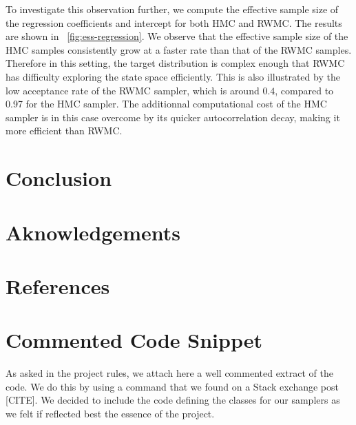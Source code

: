 \documentclass[a4paper, 12pt,oneside]{article}
\begin{document}
		To investigate this observation further, we compute the effective sample size of the regression coefficients and intercept for both HMC and RWMC. The results are shown in ~\ref{fig:ess-regression}. We observe that the effective sample size of the HMC samples consistently grow at a faster rate than that of the RWMC samples. Therefore in this setting, the target distribution is complex enough that RWMC has difficulty exploring the state space efficiently. This is also illustrated by the low acceptance rate of the RWMC sampler, which is around $0.4$, compared to 0.97 for the HMC sampler. The additionnal computational cost of the HMC sampler is in this case overcome by its quicker autocorrelation decay, making it more efficient than RWMC.
			
	\section{Conclusion}
	\section*{Aknowledgements}
	\newpage
	\section*{References}
	\appendix
		\section{Commented Code Snippet}\label{appendix:commented-code-snippet}
		As asked in the project rules, we attach here a well commented extract of the code. We do this by using a command that we found on a Stack exchange post [CITE]. We decided to include the code defining the classes for our samplers as we felt if reflected best the essence of the project.
\end{document}
